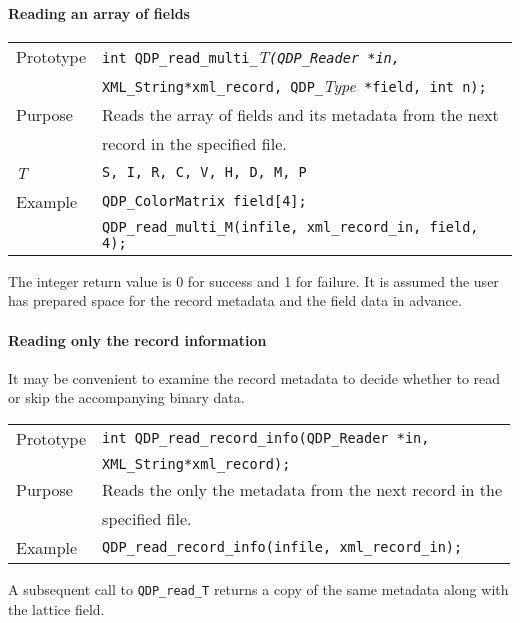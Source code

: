 \documentclass{article}
\newcommand{\allTypes}{{\tt S, I, R, C, V, H, D, M, P}}
\newcommand{\itt}{\it T}
\newcommand{\QMDhandle}{{\tt XML\_String}}
\begin{document}
\paragraph{Reading an array of fields}

\begin{flushleft}
  \begin{tabular}{|l|l|}
  \hline
  Prototype      & \verb|int QDP_read_multi_|\itt\verb|(QDP_Reader *in, |\\
                 &   \QMDhandle \verb|*xml_record, QDP_|{\it Type}\verb| *field, int n);|\\
    \hline
  Purpose        & Reads the array of fields and its metadata from the next \\
                 & record in the specified file. \\
\hline
  \itt     & \allTypes \\
   \hline
  Example  & \verb|QDP_ColorMatrix field[4];| \\
           & \verb|QDP_read_multi_M(infile, xml_record_in, field, 4);| \\
   \hline
 \end{tabular}
\end{flushleft}
%
The integer return value is 0 for success and 1 for failure.  It is
assumed the user has prepared space for the record metadata and the
field data in advance.

\paragraph{Reading only the record information}

It may be convenient to examine the record metadata to decide whether
to read or skip the accompanying binary data.

\begin{flushleft}
  \begin{tabular}{|l|l|}
  \hline
  Prototype      & \verb|int QDP_read_record_info(QDP_Reader *in,|\\
                 &  \QMDhandle \verb|*xml_record);|\\
    \hline
  Purpose        & Reads the only the metadata from the next record in the \\
                 & specified file. \\
   \hline
  Example  & \verb|QDP_read_record_info(infile, xml_record_in);| \\
   \hline
 \end{tabular}
\end{flushleft}
%
A subsequent call to \verb|QDP_read_T| returns a copy of the same
metadata along with the lattice field.
\end{document}
